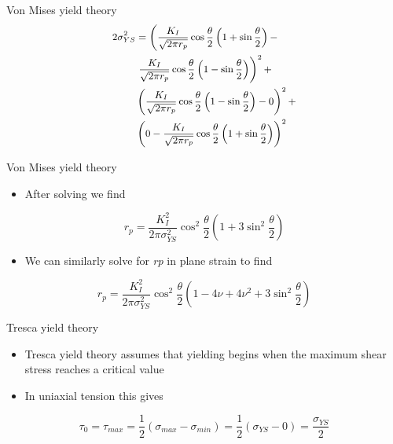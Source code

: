 \documentclass[
  letterpaper,
  ignorenonframetext,
  aspectratio=43,
  handout,
  12pt]{beamer}
\providecommand{\tightlist}{%
  \setlength{\itemsep}{0pt}\setlength{\parskip}{0pt}}
\providecommand{\tightlist}{%
\setlength{\itemsep}{0pt}\setlength{\parskip}{0pt}}
\begin{document}
\begin{frame}{Von Mises yield theory}
\protect\hypertarget{von-mises-yield-theory-3}{}
\[\small{\begin{aligned}
  2 \sigma_{YS}^2 &= \left(\frac{K_I}{\sqrt{2\pi r_p}}\cos \frac{\theta}{2}\left(1+\sin \frac{\theta}{2}\right) -\right .\\
  &\left .\frac{K_I}{\sqrt{2\pi r_p}}\cos \frac{\theta}{2}\left(1-\sin \frac{\theta}{2}\right)\right)^2 + \\
  &\left(\frac{K_I}{\sqrt{2\pi r_p}}\cos \frac{\theta}{2}\left(1-\sin \frac{\theta}{2}\right) - 0\right)^2 + \\
  &\left(0 - \frac{K_I}{\sqrt{2\pi r_p}}\cos \frac{\theta}{2}\left(1+\sin \frac{\theta}{2}\right)\right)^2
\end{aligned}}\]
\end{frame}

\begin{frame}{Von Mises yield theory}
\protect\hypertarget{von-mises-yield-theory-4}{}
\begin{itemize}
\tightlist
\item
  After solving we find
\end{itemize}

\[r_p = \frac{K_I^2}{2\pi \sigma^2_{YS}} \cos^2 \frac{\theta}{2} \left(1 + 3\sin^2 \frac{\theta}{2}\right)\]

\begin{itemize}
\tightlist
\item
  We can similarly solve for \emph{r}\emph{p} in plane strain to find
\end{itemize}

\[r_p = \frac{K_I^2}{2\pi \sigma^2_{YS}} \cos^2 \frac{\theta}{2} \left(1 -4\nu + 4\nu^2 + 3\sin^2 \frac{\theta}{2}\right)\]
\end{frame}

\begin{frame}{Tresca yield theory}
\protect\hypertarget{tresca-yield-theory}{}
\begin{itemize}
\tightlist
\item
  Tresca yield theory assumes that yielding begins when the maximum
  shear stress reaches a critical value
\item
  In uniaxial tension this gives
\end{itemize}

\[\tau_0 = \tau_{max} = \frac{1}{2}\left(\sigma_{max} - \sigma_{min}\right) = \frac{1}{2} \left(\sigma_{YS} - 0\right) = \frac{\sigma_{YS}}{2}\]
\end{frame}
\end{document}
